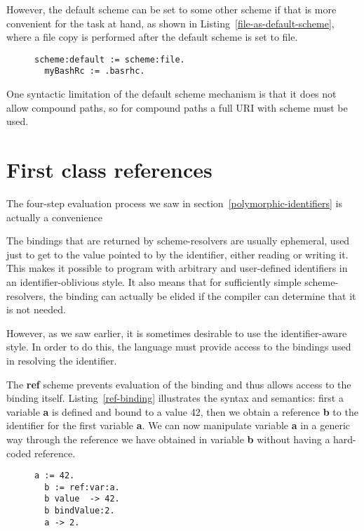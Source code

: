 \documentclass[preprint,authoryear]{acm_proc_article-sp}
\begin{document}
However, the default scheme can be set to some other scheme if that is more
convenient for the task at hand, as shown in Listing~\ref{file-as-default-scheme},
where a file copy is performed after the default scheme is set to file.


\begin{figure}[htbp]
\begin{lstlisting}[style=L,label=file-as-default-scheme,caption=File copy with file: as default scheme.]
  scheme:default := scheme:file.
  myBashRc := .basrhc.
\end{lstlisting}
\end{figure}

One syntactic limitation of the default scheme mechanism is that it does not allow
compound paths, so for compound paths a full URI with scheme must be used.




\section{First class references}

The four-step evaluation process we saw in section~\ref{polymorphic-identifiers} is
actually a convenience 

The bindings that are returned by scheme-resolvers are usually ephemeral, used just 
to get to the value pointed to by the identifier, either reading or writing it.  This
makes it possible to program with arbitrary and user-defined identifiers in
an identifier-oblivious style.  It also means that for sufficiently simple scheme-resolvers,
the binding can actually be elided if the compiler can determine that it is not needed.

However, as we saw earlier, it is sometimes
desirable to use the identifier-aware style.  In order to do this, the language
must provide access to the bindings used in resolving the identifier.

The {\bf ref} scheme prevents evaluation of the binding and thus allows access
to the binding itself.  Listing~\ref{ref-binding} illustrates the syntax and semantics:
first a variable {\bf a} is defined and bound to a value 42, then we obtain a reference {\bf b} to
the identifier for the first variable {\bf a}.  We can now manipulate variable {\bf a} 
in a generic way through the reference we have obtained in variable {\bf b} without
having a hard-coded reference. 


\begin{figure}[htbp]
\begin{lstlisting}[style=L,label=ref-binding,caption=Accessing a variable via its binding.]
  a := 42.
  b := ref:var:a.
  b value  -> 42.
  b bindValue:2.
  a -> 2.
\end{lstlisting}
\end{figure}
\end{document}
